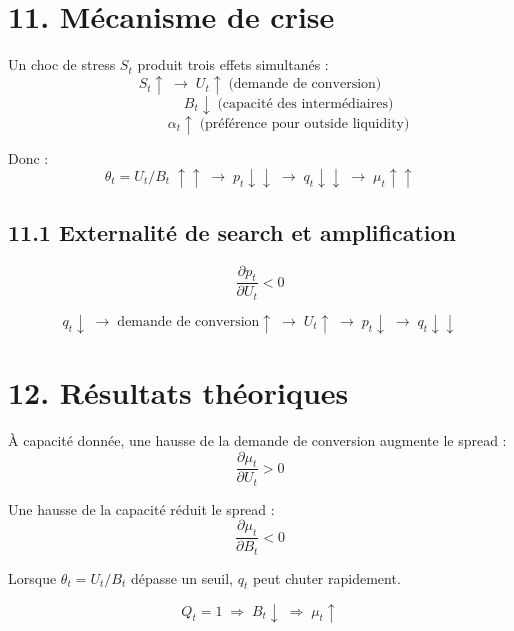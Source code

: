 \section*{11. Mécanisme de crise}

Un choc de stress $S_t$ produit trois effets simultanés :
\[
S_t \uparrow \;\to\; U_t \uparrow \;\text{(demande de conversion)}
\]
\[
\phantom{S_t \uparrow \;\to\;} B_t \downarrow \;\text{(capacité des intermédiaires)}
\]
\[
\phantom{S_t \uparrow \;\to\;} \alpha_t \uparrow \;\text{(préférence pour outside liquidity)}
\]

Donc :
\[
\theta_t = U_t/B_t \;\uparrow\uparrow \;\to\; p_t \downarrow\downarrow \;\to\; q_t \downarrow\downarrow \;\to\; \mu_t \uparrow\uparrow
\]

\subsection*{11.1 Externalité de search et amplification}

\[
\frac{\partial p_t}{\partial U_t} < 0
\]

\[
q_t \downarrow \;\to\; \text{demande de conversion} \uparrow \;\to\; U_t \uparrow \;\to\; p_t \downarrow \;\to\; q_t \downarrow\downarrow
\]

\section*{12. Résultats théoriques}

\begin{proposition}
À capacité donnée, une hausse de la demande de conversion augmente le spread :
\[
\frac{\partial \mu_t}{\partial U_t} > 0
\]
\end{proposition}

\begin{proposition}
Une hausse de la capacité réduit le spread :
\[
\frac{\partial \mu_t}{\partial B_t} < 0
\]
\end{proposition}

\begin{proposition}
Lorsque $\theta_t = U_t/B_t$ dépasse un seuil, $q_t$ peut chuter rapidement.
\end{proposition}

\begin{proposition}
\[
Q_t = 1 \;\Rightarrow\; B_t \downarrow \;\Rightarrow\; \mu_t \uparrow
\]
\end{proposition}

